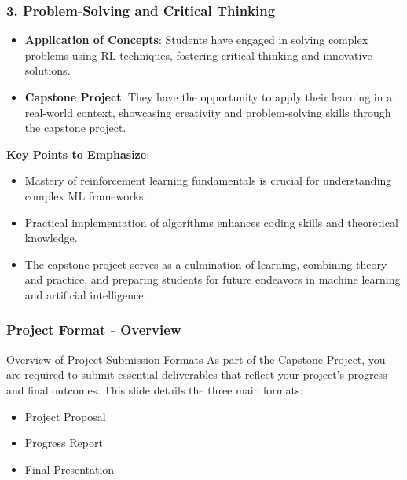 \documentclass[aspectratio=169]{beamer}
\begin{document}
\begin{frame}[fragile]
    \frametitle{3. Problem-Solving and Critical Thinking}
    \begin{itemize}
        \item \textbf{Application of Concepts}: Students have engaged in solving complex problems using RL techniques, fostering critical thinking and innovative solutions.
        \item \textbf{Capstone Project}: They have the opportunity to apply their learning in a real-world context, showcasing creativity and problem-solving skills through the capstone project.
    \end{itemize}
    \textbf{Key Points to Emphasize}:
    \begin{itemize}
        \item Mastery of reinforcement learning fundamentals is crucial for understanding complex ML frameworks.
        \item Practical implementation of algorithms enhances coding skills and theoretical knowledge.
        \item The capstone project serves as a culmination of learning, combining theory and practice, and preparing students for future endeavors in machine learning and artificial intelligence.
    \end{itemize}
\end{frame}

\begin{frame}[fragile]
    \frametitle{Project Format - Overview}
    \begin{block}{Overview of Project Submission Formats}
        As part of the Capstone Project, you are required to submit essential deliverables that reflect your project's progress and final outcomes. This slide details the three main formats: 
        \begin{itemize}
            \item Project Proposal
            \item Progress Report
            \item Final Presentation
        \end{itemize}
    \end{block}
\end{frame}
\end{document}
